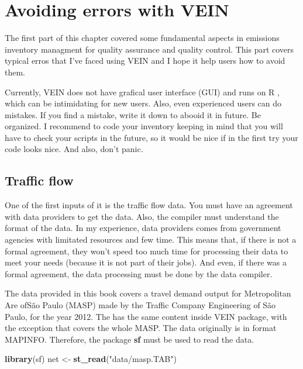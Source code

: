 \documentclass[12pt,graybox,envcountchap,sectrefs]{krantz}
\makeatletter
\newenvironment{Shaded}{\begin{snugshade}}{\end{snugshade}}
\newcommand{\KeywordTok}[1]{\textcolor[rgb]{0.13,0.29,0.53}{\textbf{#1}}}
\newcommand{\StringTok}[1]{\textcolor[rgb]{0.31,0.60,0.02}{#1}}
\newcommand{\NormalTok}[1]{#1}
\newenvironment{kframe}{%
\medskip{}
\setlength{\fboxsep}{.8em}
 \def\at@end@of@kframe{}%
 \ifinner\ifhmode%
  \def\at@end@of@kframe{\end{minipage}}%
  \begin{minipage}{\columnwidth}%
 \fi\fi%
 \def\FrameCommand##1{\hskip\@totalleftmargin \hskip-\fboxsep
 \colorbox{shadecolor}{##1}\hskip-\fboxsep
     \hskip-\linewidth \hskip-\@totalleftmargin \hskip\columnwidth}%
 \MakeFramed {\advance\hsize-\width
   \@totalleftmargin\z@ \linewidth\hsize
   \@setminipage}}%
 {\par\unskip\endMakeFramed%
 \at@end@of@kframe}
\renewenvironment{Shaded}{\begin{kframe}}{\end{kframe}}
\theoremstyle{definition}
\theoremstyle{definition}
\theoremstyle{definition}
\theoremstyle{remark}
\makeatother
\begin{document}
\section{Avoiding errors with VEIN}\label{avoiding-errors-with-vein}

The first part of this chapter covered some fundamental aspects in
emissions inventory managment for quality assurance and quality control.
This part covers typical erros that I've faced using VEIN and I hope it
help users how to avoid them.

Currently, VEIN does not have grafical user interface (GUI) and runs on
R \citep{R}, which can be intimidating for new users. Also, even
experienced users can do mistakes. If you find a mistake, write it down
to abooid it in future. Be organized. I recommend to code your inventory
keeping in mind that you will have to check your scripts in the future,
so it would be nice if in the first try your code looks nice. And also,
don't panic.

\subsection{Traffic flow}\label{traffic-flow}

One of the first inputs of it is the traffic flow data. You must have an
agreement with data providers to get the data. Also, the compiler must
understand the format of the data. In my experience, data providers
comes from government agencies with limitated resources and few time.
This means that, if there is not a formal agreement, they won't speed
too much time for processing their data to meet your needs (because it
is not part of their jobs). And even, if there was a formal agreement,
the data processing must be done by the data compiler.

The data provided in this book covers a travel demand output for
Metropolitan Are ofSão Paulo (MASP) made by the Traffic Company
Engineering of São Paulo, for the year 2012. The has the same content
inside VEIN package, with the exception that covers the whole MASP. The
data originally is in format MAPINFO. Therefore, the package \textbf{sf}
must be used to read the data.

\begin{Shaded}
\begin{Highlighting}[]
\KeywordTok{library}\NormalTok{(sf)}
\NormalTok{net <-}\StringTok{ }\KeywordTok{st_read}\NormalTok{(}\StringTok{"data/masp.TAB"}\NormalTok{)}
\end{Highlighting}
\end{Shaded}
\end{document}
